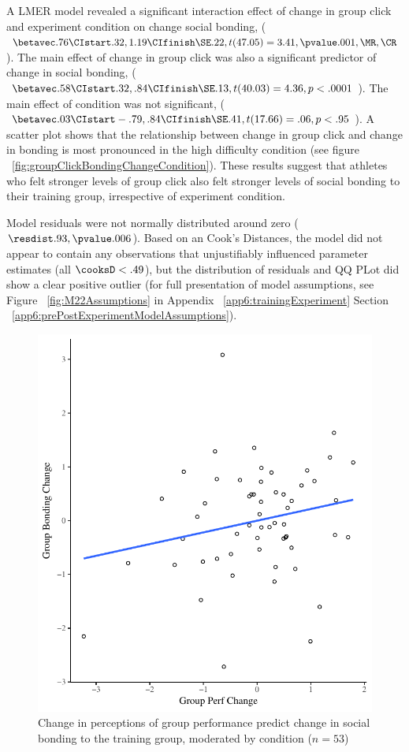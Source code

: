 A LMER model revealed a significant interaction effect of change in group click and experiment condition on change social bonding, ($\betavec .76 \CIstart .32, 1.19 \CIfinish \SE.22, t(47.05) = 3.41, \pvalue .001, \MR , \CR $).  The main effect of change in group click was also a significant predictor of change in social bonding, ($\betavec .58 \CIstart .32, .84 \CIfinish \SE.13, t(40.03) = 4.36, p < .0001 $).  The main effect of condition was not significant, ($\betavec .03 \CIstart -.79, .84 \CIfinish \SE.41, t(17.66) = .06, p < .95 $).  A scatter plot shows that the relationship between change in group click and change in bonding is most pronounced in the high difficulty condition (see figure ~\ref{fig:groupClickBondingChangeCondition}). These results suggest that athletes who felt stronger levels of group click also felt stronger levels of social bonding to their training group, irrespective of experiment condition.

Model residuals were not normally distributed around zero ($\resdist .93, \pvalue .006$). Based on an Cook's Distances, the model did not appear to contain any observations that unjustifiably influenced parameter estimates (all $\cooksD < .49$), but the distribution of residuals and QQ PLot did show a clear positive outlier (for full presentation of model assumptions, see Figure ~\ref{fig:M22Assumptions} in Appendix ~\ref{app6:trainingExperiment} Section ~\ref{app6:prePostExperimentModelAssumptions}).






\begin{figure}
  \centering
  \includegraphics[width=0.5\linewidth,keepaspectratio] {images/groupPerfBondingChangeCondition}
  \caption{Change in perceptions of group performance predict change in social bonding to the training group, moderated by condition ($n = 53$)}
 \label{fig:groupPerfBondingChangeCondition}
\end{figure}


